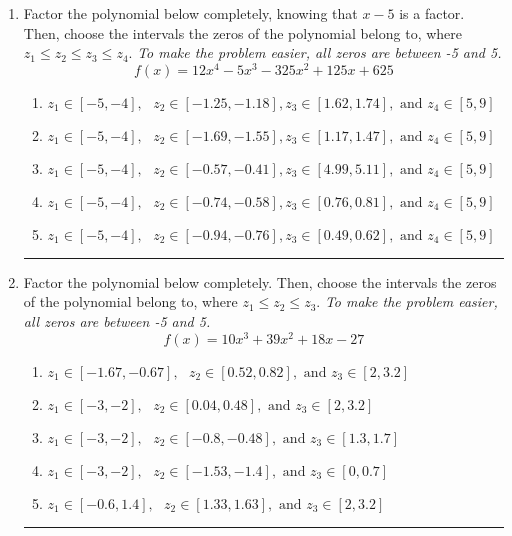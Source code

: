 \documentclass[14pt]{extbook}
\newcommand{\litem}[1]{\item#1\hspace*{-1cm}\rule{\textwidth}{0.4pt}}
\begin{document}
\begin{enumerate}
{\begin{enumerate}[label=\Alph*.]
\end{enumerate} }
\litem{
Factor the polynomial below completely, knowing that $x-5$ is a factor. Then, choose the intervals the zeros of the polynomial belong to, where $z_1 \leq z_2 \leq z_3 \leq z_4$. \textit{To make the problem easier, all zeros are between -5 and 5.}\[ f(x) = 12x^{4} -5 x^{3} -325 x^{2} +125 x + 625 \]\begin{enumerate}[label=\Alph*.]
\item \( z_1 \in [-5, -4], \text{   }  z_2 \in [-1.25, -1.18], z_3 \in [1.62, 1.74], \text{   and   } z_4 \in [5, 9] \)
\item \( z_1 \in [-5, -4], \text{   }  z_2 \in [-1.69, -1.55], z_3 \in [1.17, 1.47], \text{   and   } z_4 \in [5, 9] \)
\item \( z_1 \in [-5, -4], \text{   }  z_2 \in [-0.57, -0.41], z_3 \in [4.99, 5.11], \text{   and   } z_4 \in [5, 9] \)
\item \( z_1 \in [-5, -4], \text{   }  z_2 \in [-0.74, -0.58], z_3 \in [0.76, 0.81], \text{   and   } z_4 \in [5, 9] \)
\item \( z_1 \in [-5, -4], \text{   }  z_2 \in [-0.94, -0.76], z_3 \in [0.49, 0.62], \text{   and   } z_4 \in [5, 9] \)

\end{enumerate} }
\litem{
Factor the polynomial below completely. Then, choose the intervals the zeros of the polynomial belong to, where $z_1 \leq z_2 \leq z_3$. \textit{To make the problem easier, all zeros are between -5 and 5.}\[ f(x) = 10x^{3} +39 x^{2} +18 x -27 \]\begin{enumerate}[label=\Alph*.]
\item \( z_1 \in [-1.67, -0.67], \text{   }  z_2 \in [0.52, 0.82], \text{   and   } z_3 \in [2, 3.2] \)
\item \( z_1 \in [-3, -2], \text{   }  z_2 \in [0.04, 0.48], \text{   and   } z_3 \in [2, 3.2] \)
\item \( z_1 \in [-3, -2], \text{   }  z_2 \in [-0.8, -0.48], \text{   and   } z_3 \in [1.3, 1.7] \)
\item \( z_1 \in [-3, -2], \text{   }  z_2 \in [-1.53, -1.4], \text{   and   } z_3 \in [0, 0.7] \)
\item \( z_1 \in [-0.6, 1.4], \text{   }  z_2 \in [1.33, 1.63], \text{   and   } z_3 \in [2, 3.2] \)

\end{enumerate} }
\end{enumerate}
\end{document}
